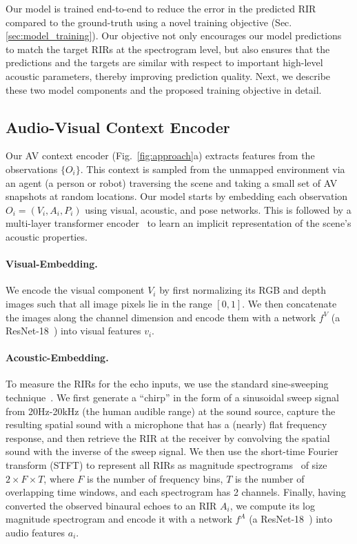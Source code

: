 Our model is trained end-to-end to reduce the error in the predicted RIR compared to the ground-truth using a novel training objective (Sec.\ref{sec:model_training}).
Our objective not only encourages our model predictions to match the target RIRs at the spectrogram level, but also ensures that the predictions and the targets are similar with respect to important high-level acoustic parameters, thereby improving prediction quality. Next, we describe these two model components and the proposed training objective in detail.

\subsection{Audio-Visual Context Encoder}\label{sec:av_context_encoder}
Our AV context encoder (Fig.~\ref{fig:approach}a) extracts features from the observations $\{O_i\}$. This context is sampled from the unmapped environment via an agent (a person or robot) traversing the scene and taking a small set of AV snapshots at random locations. Our model starts by embedding each observation $O_i=(V_i, A_i, P_i)$ using visual, acoustic, and  pose networks. This is followed by a multi-layer transformer encoder~\citep{vaswani2017attention} to learn an implicit representation of the scene's acoustic properties.

\paragraph{Visual-Embedding.}
We encode the visual component $V_i$ by first normalizing its RGB and depth images such that all image pixels lie in the range $[0, 1]$. We then concatenate the images along the channel dimension and encode them with a network $f^V$ (a ResNet-18~\citep{he2016deep}) into visual features $v_i$. 

\paragraph{Acoustic-Embedding.} 
To measure the RIRs for the echo inputs, we use the standard sine-sweeping technique~\citep{farina2000simultaneous}.  We first generate a ``chirp'' in the form of a sinusoidal sweep signal from 20Hz-20kHz (the human audible range) at the sound source, capture the resulting spatial sound with a microphone that has a (nearly) flat frequency response, and then retrieve the RIR at the receiver by convolving the spatial sound with the inverse of the sweep signal. We then use the short-time Fourier transform (STFT) to represent all RIRs as magnitude spectrograms~\citep{singh2021image2reverb, luo2022learning} of size $2 \times F \times T$, where $F$ is the number of frequency bins, $T$ is the number of overlapping time windows, and each spectrogram has 2 channels.  Finally, having converted the observed binaural echoes to an RIR $A_i$, we compute its log magnitude spectrogram and encode it with a network $f^A$ (a ResNet-18~\citep{he2016deep}) into audio features $a_i$. 

